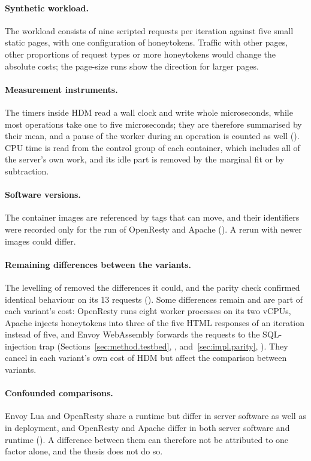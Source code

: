 \documentclass{rptuma}
\begin{document}
\paragraph{Synthetic workload.} The workload consists of nine scripted requests per iteration
against five small static pages, with one configuration of honeytokens. Traffic with other pages,
other proportions of request types or more honeytokens would change the absolute costs; the
page-size runs show the direction for larger pages.

\paragraph{Measurement instruments.} The timers inside HDM read a wall clock and write whole
microseconds, while most operations take one to five microseconds; they are therefore summarised by
their mean, and a pause of the worker during an operation is counted as well
(). CPU time is read from the control group of each container, which
includes all of the server's own work, and its idle part is removed by the marginal fit or by
subtraction.

\paragraph{Software versions.} The container images are referenced by tags that can move, and
their identifiers were recorded only for the run of OpenResty and Apache
(). A rerun with newer images could differ.

\paragraph{Remaining differences between the variants.} The levelling of 
removed the differences it could, and the parity check confirmed identical behaviour on its 13
requests (). Some differences remain and are part of each variant's
cost: OpenResty runs eight worker processes on its two vCPUs, Apache injects honeytokens into three
of the five HTML responses of an iteration instead of five, and Envoy WebAssembly forwards the
requests to the SQL-injection trap (Sections~\ref{sec:method.testbed},
\emph{}, and~\ref{sec:impl.parity},
\emph{}). They cancel in each variant's own cost of HDM but affect the
comparison between variants.

\paragraph{Confounded comparisons.} Envoy Lua and OpenResty share a runtime but differ in server
software as well as in deployment, and OpenResty and Apache differ in both server software and
runtime (). A difference between them can therefore not be attributed to
one factor alone, and the thesis does not do so.
\end{document}
